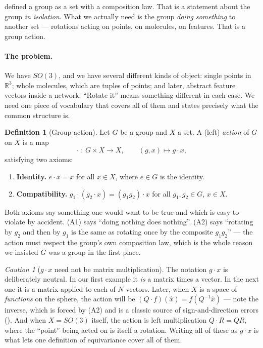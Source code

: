\documentclass[11pt,a4paper]{report}
\theoremstyle{definition}
\newtheorem{definition}[definition]{Definition}
\theoremstyle{remark}
\newtheorem{caution}[caution]{Caution}
\newcommand{\RR}{\mathbb R}
\begin{document}
 defined a group as a set with a composition law.
That is a statement about the group \emph{in isolation}. What we actually
need is the group \emph{doing something} to another set --- rotations acting
on points, on molecules, on features. That is a group action.

\paragraph{The problem.} We have $SO(3)$, and we have several different
kinds of object: single points in $\RR^3$; whole molecules, which are tuples
of points; and later, abstract feature vectors inside a network. ``Rotate
it'' means something different in each case. We need one piece of vocabulary
that covers all of them and states precisely what the common structure is.

\begin{definition}[Group action]
\label{def:group-action}
Let $G$ be a group and $X$ a set. A (left) \emph{action} of $G$ on $X$ is a
map
\[
\cdot\;:\;G\times X\to X,
\qquad (g,x)\mapsto g\cdot x ,
\]
satisfying two axioms:
\begin{enumerate}[nosep,label=(A\arabic*)]
\item \textbf{Identity.} $e\cdot x = x$ for all $x\in X$, where $e\in G$ is
the identity.
\item \textbf{Compatibility.} $g_1\cdot(g_2\cdot x) = (g_1g_2)\cdot x$ for
all $g_1,g_2\in G$, $x\in X$.
\end{enumerate}
\end{definition}

Both axioms say something one would want to be true and which is easy to
violate by accident. (A1) says ``doing nothing does nothing''. (A2) says
``rotating by $g_2$ and then by $g_1$ is the same as rotating once by the
composite $g_1g_2$'' --- the action must respect the group's own composition
law, which is the whole reason we insisted $G$ was a group in the first
place.

\begin{caution}[$g\cdot x$ need not be matrix multiplication]
\label{caution:action-not-matmul}
The notation $g\cdot x$ is deliberately neutral. In our first example it
\emph{is} a matrix times a vector. In the next one it is a matrix applied to
each of $N$ vectors. Later, when $X$ is a space of \emph{functions} on the
sphere, the action will be
$(Q\cdot f)(\hat x) = f(Q^{-1}\hat x)$ --- note the inverse, which is
forced by (A2) and is a classic source of sign-and-direction errors
(). And when $X=SO(3)$ itself, the
action is left multiplication $Q\cdot R = QR$, where the ``point'' being
acted on is itself a rotation. Writing all of these as $g\cdot x$ is what
lets one definition of equivariance cover all of them.
\end{caution}
\end{document}
